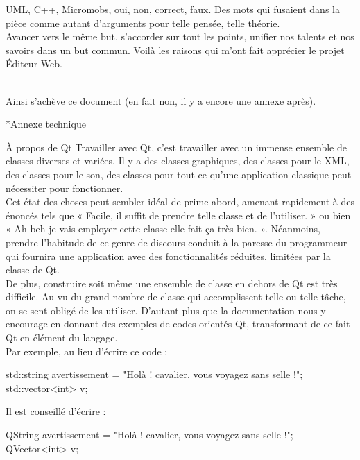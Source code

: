 \documentclass[a4paper, 12pt]{report}
\begin{document}
\begin{chapter}
\begin{section}
		UML, C++, Micromobs, oui, non, correct, faux. Des mots qui fusaient dans la pièce comme autant d'arguments pour telle pensée, telle
		théorie.\\

		Avancer vers le même but, s'accorder sur tout les points, unifier nos talents et nos savoirs dans un but commun. Voilà les raisons
		qui m'ont fait apprécier le projet Éditeur Web.
		\end{section}~\\

		Ainsi s'achève ce document (en fait non, il y a encore une annexe après).\\
	\end{chapter}
	\begin{chapter}*{Annexe technique}
	\label{annexe}
	\begin{section}{À propos de Qt}
			Travailler avec \gls{Qt}, c'est travailler avec un immense ensemble de classes diverses et variées. 
			Il y a des classes graphiques, des classes pour le XML, des classes pour le son, des classes pour tout ce qu'une application classique
			peut nécessiter pour fonctionner.\\

			Cet état des choses peut sembler idéal de prime abord, amenant rapidement à des énoncés tels que « Facile, il suffit de prendre telle classe
			et de l'utiliser. » ou bien « Ah beh je vais employer cette classe elle fait ça très bien. ». Néanmoins, prendre l'habitude de ce genre de 
			discours conduit à la paresse du programmeur qui fournira une application avec des fonctionnalités réduites,
			limitées par la classe de \gls{Qt}.\\

			De plus, construire soit même une ensemble de classe en dehors de \gls{Qt} est très difficile. Au vu du grand nombre de classe qui
			accomplissent telle ou telle tâche, on se sent obligé de les utiliser. D'autant plus que la documentation nous y encourage en donnant des exemples de codes orientés \gls{Qt}, transformant de ce fait \gls{Qt} en élément du langage.\\

			\noindent
			Par exemple, au lieu d'écrire ce code : 
			\begin{center}
			\begin{cppcode}
std::string avertissement = "Holà ! cavalier, vous voyagez sans selle !";
std::vector<int> v;
			\end{cppcode}
			\end{center}
			Il est conseillé d'écrire : 
			\begin{center}
			\begin{cppcode}
QString avertissement = "Holà ! cavalier, vous voyagez sans selle !";
QVector<int> v;
			\end{cppcode}
			\end{center}~\\


\end{section}
\end{chapter}
\end{document}
